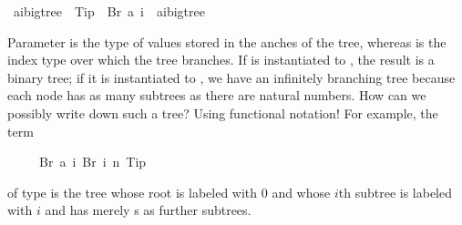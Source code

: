 %
\begin{isabellebody}%
\def\isabellecontext{Fundata}%
\ {\isacharparenleft}{\isacharprime}a{\isacharcomma}{\isacharprime}i{\isacharparenright}bigtree\ {\isacharequal}\ Tip\ {\isacharbar}\ Br\ {\isacharprime}a\ {\isachardoublequote}{\isacharprime}i\ {\isasymRightarrow}\ {\isacharparenleft}{\isacharprime}a{\isacharcomma}{\isacharprime}i{\isacharparenright}bigtree{\isachardoublequote}%
\begin{isamarkuptext}%
\noindent
Parameter  is the type of values stored in
the anches of the tree, whereas  is the index
type over which the tree branches. If  is instantiated to
, the result is a binary tree; if it is instantiated to
, we have an infinitely branching tree because each node
has as many subtrees as there are natural numbers. How can we possibly
write down such a tree? Using functional notation! For example, the term
\begin{isabelle}%
\ \ \ \ \ Br\ {\isacharparenleft}{}{\isasymColon}{\isacharprime}a{\isacharparenright}\ {\isacharparenleft}{\isasymlambda}i{\isachardot}\ Br\ i\ {\isacharparenleft}{\isasymlambda}n{\isachardot}\ Tip{\isacharparenright}{\isacharparenright}%
\end{isabelle}
of type  is the tree whose
root is labeled with 0 and whose $i$th subtree is labeled with $i$ and
has merely s as further subtrees.


\end{isamarkuptext}
\end{isabellebody}
